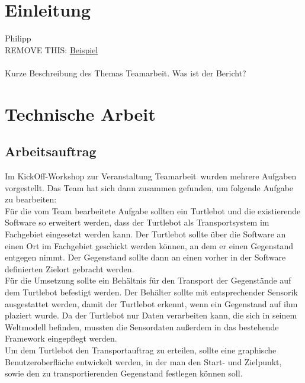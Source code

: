 \documentclass[a4paper,12pt,headsepline]{scrartcl}
\begin{document}
	\tableofcontents
	\newpage
	
	\section{Einleitung}
		Philipp\\
		REMOVE THIS: \href{https://docs.google.com/document/d/1wGlFley6lwhnpLsj8ms7M6fnOjplazlHNr8Bfbv3vso/edit}{Beispiel}\\\\
		Kurze Beschreibung des Themas Teamarbeit. Was ist der Bericht?
	\newpage
	\section{Technische Arbeit}
	
	\subsection{Arbeitsauftrag}
		Im KickOff-Workshop zur Veranstaltung \glqq Teamarbeit\grqq\ wurden mehrere Aufgaben vorgestellt. Das Team hat sich dann zusammen gefunden, um folgende Aufgabe zu bearbeiten: \\
		Für die vom Team bearbeitete Aufgabe sollten ein Turtlebot und die existierende Software so erweitert werden, dass der Turtlebot als Transportsystem im Fachgebiet eingesetzt werden kann. Der Turtlebot sollte über die Software an einen Ort im Fachgebiet geschickt werden können, an dem er einen Gegenstand entgegen nimmt. Der Gegenstand sollte dann an einen vorher in der Software definierten Zielort gebracht werden. \\
		Für die Umsetzung sollte ein Behältnis  für den Transport der Gegenstände auf dem Turtlebot befestigt werden. Der Behälter sollte mit entsprechender Sensorik ausgestattet werden, damit der Turtlebot erkennt, wenn ein Gegenstand auf ihm plaziert wurde. Da der Turtlebot nur Daten verarbeiten kann, die sich in seinem Weltmodell befinden, mussten die Sensordaten außerdem in das bestehende Framework eingepflegt werden.\\
		Um dem Turtlebot den Transportauftrag zu erteilen, sollte eine graphische Benutzeroberfläche entwickelt werden, in der man den Start- und Zielpunkt, sowie den zu transportierenden Gegenstand festlegen können soll.  

		
	
\end{document}
